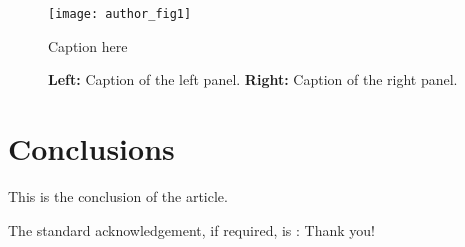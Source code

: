 \documentclass{sf2a-conf2022}
\begin{document}
\begin{figure}[ht!]
 \centering
 \texttt{[image: author\_fig1]}      
  \caption{Caption here}
  \label{author1:fig1}
\end{figure}

\begin{figure}[ht!]
 \centering
  \caption{{\bf Left:} Caption of the left panel. {\bf Right:} Caption of the right panel. }
  \label{author1:fig2}
\end{figure}

\section{Conclusions}

This is the conclusion of the article.

\begin{acknowledgements}
The standard acknowledgement, if required, is : Thank you!
\end{acknowledgements}

\end{document}

